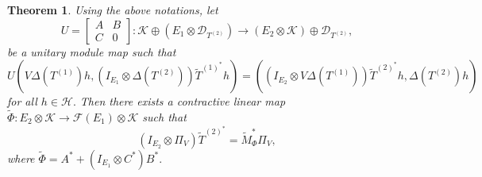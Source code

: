 \documentclass[12pt]{amsart}
\numberwithin{equation}{section}
\theoremstyle{plain}
\newtheorem{theorem}{Theorem}[section]
\newcommand{\ot}{\otimes}
\newcommand{\wt}{\widetilde}
\newcommand{\wT}{\wt{T}}
\begin{document}
\begin{theorem}\label{identity}
	Using the above notations, let \begin{equation}
			\label{unitary} U = \begin{bmatrix}A&B\\C&0\end{bmatrix}:
			\mathcal{K} \oplus  (E_1 \ot\mathcal{D}_{ T^{(2)}})\to (E_2 \ot \mathcal{K}) \oplus  \mathcal{D}_{ T^{(2)}},
		\end{equation} be a unitary module map such that $$U(V\Delta(T^{(1)})h,(I_{E_1} \ot \Delta(T^{(2)}))\wT^{(1)^*}h)=((I_{E_2} \ot V\Delta(T^{(1)}))\wT^{(2)^*}h,\Delta(T^{(2)})h)$$ for all $h\in \mathcal{H}.$ Then there exists a contractive linear map $\widetilde{\Phi}:E_2\ot \mathcal{K}\to \mathcal{F}(E_1)\ot \mathcal{K}$ such that $$ (I_{E_2}\ot \Pi_V)\wT^{(2)^*}=\widetilde{M}_{\Phi}^*\Pi_V,$$ where $\widetilde{\Phi}=A^*+(I_{E_1}\ot C^*)B^*.$
	  \end{theorem}
\end{document}
